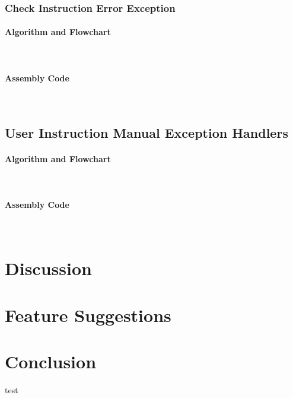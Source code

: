 \documentclass[12pt]{article}
\begin{document}
			\subsubsection{Check Instruction Error Exception}
			\paragraph{Algorithm and Flowchart}~\\
			\paragraph{Assembly Code}~\\				
			
			\subsection{User Instruction Manual Exception Handlers}
			\paragraph{Algorithm and Flowchart}~\\
			\paragraph{Assembly Code}~\\
			
			\section{Discussion}
			
			\section{Feature Suggestions}
			
			\section{Conclusion}
			
			\begin{thebibliography}{1}
				 test
			\end{thebibliography}
\end{document}
